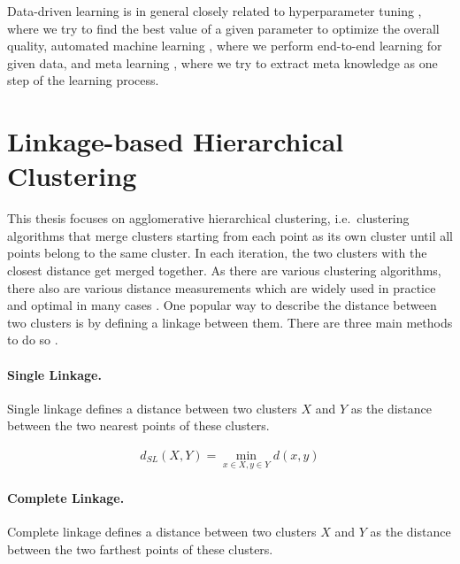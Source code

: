 Data-driven learning is in general closely related to hyperparameter tuning \cite{hutter2015beyond}, where we try to find the best value of a given parameter to optimize the overall quality, automated machine learning \cite{lacoste2014sequential,liu2018very}, where we perform end-to-end learning for given data, and meta learning \cite{alexandros2001model}, where we try to extract meta knowledge as one step of the learning process.

\section{Linkage-based Hierarchical Clustering}

This thesis focuses on agglomerative hierarchical clustering, i.e.\ clustering algorithms that merge clusters starting from each point as its own cluster until all points belong to the same cluster. In each iteration, the two clusters with the closest distance get merged together. As there are various clustering algorithms, there also are various distance measurements which are widely used in practice and optimal in many cases \cite{awasthi2017local,saeed2003software,white2010alignment,awasthi2012center,balcan2016clustering,grosswendt2017improved}. One popular way to describe the distance between two clusters is by defining a linkage between them. There are three main methods to do so \cite{Manning:2008:IIR:1394399}.

\paragraph{Single Linkage.}

Single linkage defines a distance between two clusters $X$ and $Y$ as the distance between the two nearest points of these clusters.

\begin{equation*}
    \begin{aligned}
        d_{SL}(X,Y) = \min\limits_{x \in X, y \in Y} d(x,y)
    \end{aligned}
    \label{eq:singlelinkage}
\end{equation*}

\paragraph{Complete Linkage.}

Complete linkage defines a distance between two clusters $X$ and $Y$ as the distance between the two farthest points of these clusters.

